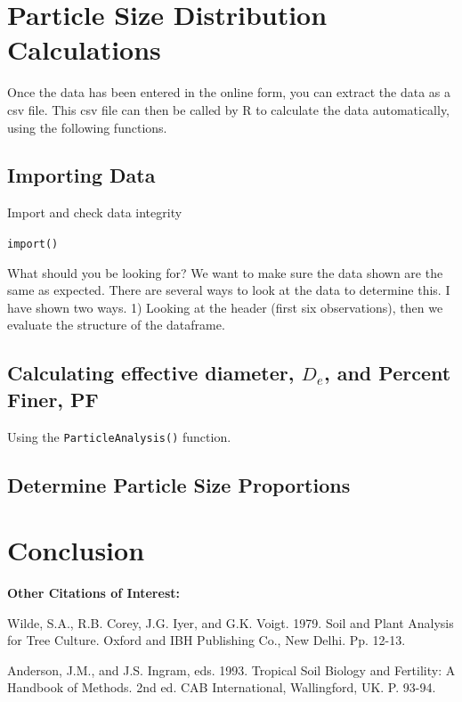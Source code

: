 \documentclass{tufte-handout}
\begin{document}
\section{Particle Size Distribution Calculations}

Once the data has been entered in the online form, you can extract the data as a csv file. This csv file can then be called by R to calculate the data automatically, using the following functions. 

\subsection{Importing Data}

Import and check data integrity

\texttt{import()}

What should you be looking for?  We want to make sure the data shown are the same as expected. There are several ways to look at the data to determine this. I have shown two ways. 1) Looking at the header (first six observations), then we evaluate the structure of the dataframe.
 
\subsection{Calculating effective diameter, $D_e$, and Percent Finer, PF}

Using the \texttt{ParticleAnalysis()} function.

\subsection{Determine Particle Size Proportions}


\section{Conclusion}




\FloatBarrier 
\begin{fullwidth}




\medskip
\noindent \textbf{Other Citations of Interest:} 

Wilde, S.A., R.B. Corey, J.G. Iyer, and G.K. Voigt.  1979.  Soil and Plant Analysis for Tree Culture.  Oxford and IBH Publishing Co., New Delhi.  Pp. 12-13.

Anderson, J.M., and J.S. Ingram, eds.  1993.  Tropical Soil Biology and Fertility:  A Handbook of Methods. 2nd ed.  CAB International, Wallingford, UK.  P. 93-94.

\end{fullwidth}
\end{document}

